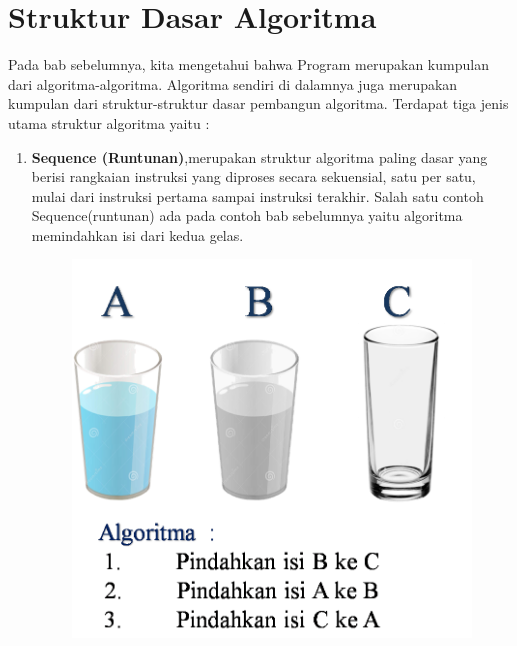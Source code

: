 \section{Struktur Dasar Algoritma}
Pada bab sebelumnya, kita mengetahui bahwa Program merupakan kumpulan dari algoritma-algoritma. Algoritma sendiri di dalamnya juga merupakan kumpulan dari struktur-struktur dasar pembangun algoritma. Terdapat tiga jenis utama struktur algoritma yaitu : 

\begin{enumerate}
	\item \textbf{Sequence  (Runtunan)},merupakan struktur algoritma paling dasar yang berisi rangkaian instruksi yang diproses secara sekuensial, satu per satu, mulai dari instruksi pertama sampai instruksi terakhir. Salah satu contoh Sequence(runtunan) ada pada contoh bab sebelumnya yaitu algoritma memindahkan isi dari kedua gelas. 
	\begin{figure}
	\centering
	\includegraphics[scale=0.4]{fig/1/Gambar13.png}	
	\end{figure}
	

\end{enumerate}
